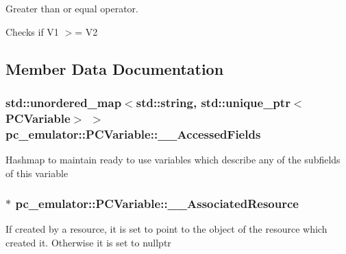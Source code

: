 {Greater than or equal operator. 

Checks if V1 $>$= V2 

\subsection{Member Data Documentation}
\subsubsection[{\texorpdfstring{\+\_\+\+\_\+\+Accessed\+Fields}{__AccessedFields}}]{\setlength{\rightskip}{0pt plus 5cm}std\+::unordered\+\_\+map$<$std\+::string, std\+::unique\+\_\+ptr$<${\bf P\+C\+Variable}$>$ $>$ pc\+\_\+emulator\+::\+P\+C\+Variable\+::\+\_\+\+\_\+\+Accessed\+Fields}\hypertarget{classpc__emulator_1_1PCVariable_a54c91836070f95a12e0cc1e25d683f88}{}\label{classpc__emulator_1_1PCVariable_a54c91836070f95a12e0cc1e25d683f88}
Hashmap to maintain ready to use variables which describe any of the subfields of this variable 
\subsubsection[{\texorpdfstring{\+\_\+\+\_\+\+Associated\+Resource}{__AssociatedResource}}]{$\ast$ pc\+\_\+emulator\+::\+P\+C\+Variable\+::\+\_\+\+\_\+\+Associated\+Resource}\hypertarget{classpc__emulator_1_1PCVariable_aee0f12f8e7ef8f3a53953823f8a28d22}{}\label{classpc__emulator_1_1PCVariable_aee0f12f8e7ef8f3a53953823f8a28d22}
If created by a resource, it is set to point to the object of the resource which created it. Otherwise it is set to nullptr 
}
